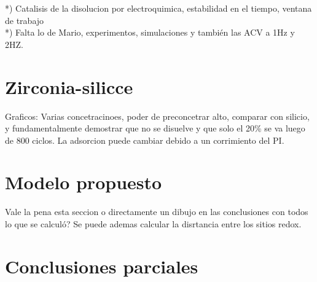 
		*) Catalisis de la disolucion por electroquimica, estabilidad en el tiempo, ventana de trabajo\\
		*) Falta lo de Mario, experimentos, simulaciones y también las ACV a 1Hz y 2HZ.



	\section{Zirconia-silicce}

		Graficos: Varias concetracinoes, poder de preconcetrar alto, comparar con silicio, y fundamentalmente demostrar que no se disuelve y que solo el 20\% se va luego de 800 ciclos.
		La adsorcion puede cambiar debido a un corrimiento del PI.


\section{Modelo propuesto}

Vale la pena esta seccion o directamente un dibujo en las conclusiones con todos lo que se calculó? Se puede ademas calcular la disrtancia entre los sitios redox.

\section{Conclusiones parciales}

